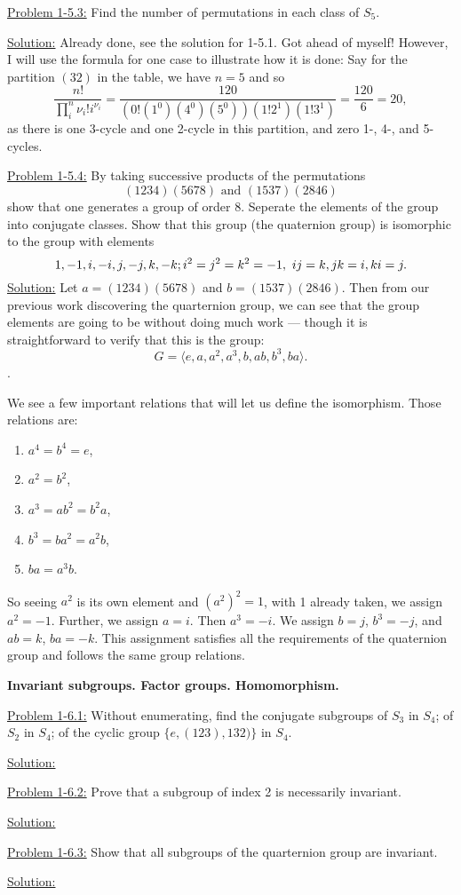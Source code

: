 \documentclass[12pt]{article}
\begin{document}
\underline{Problem 1-5.3:} Find the number of permutations in each class of
$S_5$.

\underline{Solution:} Already done, see the solution for 1-5.1. Got ahead of
myself! However, I will use the formula for one case to illustrate how it is
done: Say for the partition $(32)$ in the table, we have $n=5$ and so
\[
    \frac{n!}{\prod_i^n \nu_i! i^{\nu_i}} = \frac{120}{(0!(1^0)(4^0)(5^0))
    (1!2^1)(1!3^1)} = \frac{120}{6} = 20,
\]
as there is one 3-cycle and one 2-cycle in this partition, and zero 1-, 4-, and
5-cycles.

\underline{Problem 1-5.4:} By taking successive products of the permutations 
\[
    (1234)(5678) \text{      and       } (1537)(2846)
\]
show that one generates a group of order 8. Seperate the elements of the
group into conjugate classes. Show that this group (the quaternion group) is
isomorphic to the group with elements
\[
1, -1, i, -i, j, -j, k, -k; \\
i^2 = j^2 = k^2 = -1, \text{  } ij = k, jk = i, ki = j.
\]
\underline{Solution:} Let $a = (1234)(5678)$ and $b = (1537)(2846)$. Then from
our previous work discovering the quarternion group, we can see that the group
elements are going to be without doing much work --- though it is
straightforward to verify that this is the group:
\[
G = \langle e, a, a^2, a^3, b, ab, b^3, ba \rangle.
\].

We see a few important relations that will let us define the isomorphism. Those
relations are:
\begin{enumerate}
    \item $a^4 = b^4 = e$,
    \item $a^2 = b^2$,
    \item $a^3 =ab^2 = b^2a$,
    \item $b^3 =ba^2 = a^2b$,
    \item $ba = a^3b$.
\end{enumerate}

So seeing $a^2$ is its own element and $(a^2)^2 = 1$, with 1 already taken, we
assign $a^2 = -1$. Further, we assign $a = i$. Then $a^3 = -i$. We assign
$b = j$, $b^3 = -j$, and $ab = k$, $ba = -k$. This assignment satisfies all the
requirements of the quaternion group and follows the same group relations.

\newpage

\textbf{Invariant subgroups. Factor groups. Homomorphism.}

\underline{Problem 1-6.1:} Without enumerating, find the conjugate subgroups of
$S_3$ in $S_4$; of $S_2$ in $S_4$; of the cyclic group $\{e , (123), 132) \}$
in $S_4$. 

\underline{Solution:} 

\underline{Problem 1-6.2:} Prove that a subgroup of index 2 is necessarily
invariant. 

\underline{Solution:} 

\underline{Problem 1-6.3:} Show that all subgroups of the quarternion group are
invariant.

\underline{Solution:} 
\end{document}
